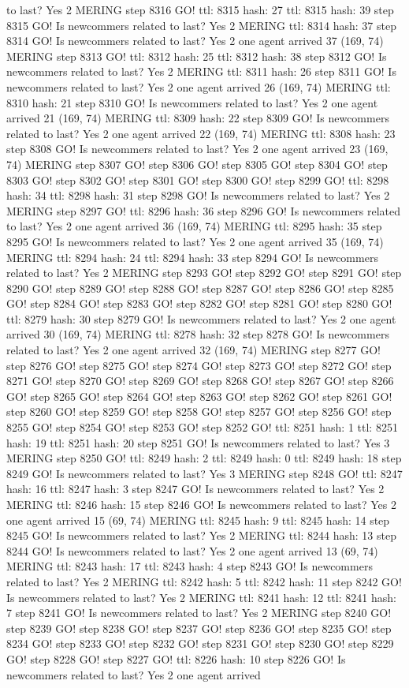 to last? Yes 2 MERING step 8316 GO! ttl: 8315 hash: 27 ttl: 8315 hash: 39 step 8315 GO! Is newcommers related to last? Yes 2 MERING ttl: 8314 hash: 37 step 8314 GO! Is newcommers related to last? Yes 2 one agent arrived 37 (169, 74) MERING step 8313 GO! ttl: 8312 hash: 25 ttl: 8312 hash: 38 step 8312 GO! Is newcommers related to last? Yes 2 MERING ttl: 8311 hash: 26 step 8311 GO! Is newcommers related to last? Yes 2 one agent arrived 26 (169, 74) MERING ttl: 8310 hash: 21 step 8310 GO! Is newcommers related to last? Yes 2 one agent arrived 21 (169, 74) MERING ttl: 8309 hash: 22 step 8309 GO! Is newcommers related to last? Yes 2 one agent arrived 22 (169, 74) MERING ttl: 8308 hash: 23 step 8308 GO! Is newcommers related to last? Yes 2 one agent arrived 23 (169, 74) MERING step 8307 GO! step 8306 GO! step 8305 GO! step 8304 GO! step 8303 GO! step 8302 GO! step 8301 GO! step 8300 GO! step 8299 GO! ttl: 8298 hash: 34 ttl: 8298 hash: 31 step 8298 GO! Is newcommers related to last? Yes 2 MERING step 8297 GO! ttl: 8296 hash: 36 step 8296 GO! Is newcommers related to last? Yes 2 one agent arrived 36 (169, 74) MERING ttl: 8295 hash: 35 step 8295 GO! Is newcommers related to last? Yes 2 one agent arrived 35 (169, 74) MERING ttl: 8294 hash: 24 ttl: 8294 hash: 33 step 8294 GO! Is newcommers related to last? Yes 2 MERING step 8293 GO! step 8292 GO! step 8291 GO! step 8290 GO! step 8289 GO! step 8288 GO! step 8287 GO! step 8286 GO! step 8285 GO! step 8284 GO! step 8283 GO! step 8282 GO! step 8281 GO! step 8280 GO! ttl: 8279 hash: 30 step 8279 GO! Is newcommers related to last? Yes 2 one agent arrived 30 (169, 74) MERING ttl: 8278 hash: 32 step 8278 GO! Is newcommers related to last? Yes 2 one agent arrived 32 (169, 74) MERING step 8277 GO! step 8276 GO! step 8275 GO! step 8274 GO! step 8273 GO! step 8272 GO! step 8271 GO! step 8270 GO! step 8269 GO! step 8268 GO! step 8267 GO! step 8266 GO! step 8265 GO! step 8264 GO! step 8263 GO! step 8262 GO! step 8261 GO! step 8260 GO! step 8259 GO! step 8258 GO! step 8257 GO! step 8256 GO! step 8255 GO! step 8254 GO! step 8253 GO! step 8252 GO! ttl: 8251 hash: 1 ttl: 8251 hash: 19 ttl: 8251 hash: 20 step 8251 GO! Is newcommers related to last? Yes 3 MERING step 8250 GO! ttl: 8249 hash: 2 ttl: 8249 hash: 0 ttl: 8249 hash: 18 step 8249 GO! Is newcommers related to last? Yes 3 MERING step 8248 GO! ttl: 8247 hash: 16 ttl: 8247 hash: 3 step 8247 GO! Is newcommers related to last? Yes 2 MERING ttl: 8246 hash: 15 step 8246 GO! Is newcommers related to last? Yes 2 one agent arrived 15 (69, 74) MERING ttl: 8245 hash: 9 ttl: 8245 hash: 14 step 8245 GO! Is newcommers related to last? Yes 2 MERING ttl: 8244 hash: 13 step 8244 GO! Is newcommers related to last? Yes 2 one agent arrived 13 (69, 74) MERING ttl: 8243 hash: 17 ttl: 8243 hash: 4 step 8243 GO! Is newcommers related to last? Yes 2 MERING ttl: 8242 hash: 5 ttl: 8242 hash: 11 step 8242 GO! Is newcommers related to last? Yes 2 MERING ttl: 8241 hash: 12 ttl: 8241 hash: 7 step 8241 GO! Is newcommers related to last? Yes 2 MERING step 8240 GO! step 8239 GO! step 8238 GO! step 8237 GO! step 8236 GO! step 8235 GO! step 8234 GO! step 8233 GO! step 8232 GO! step 8231 GO! step 8230 GO! step 8229 GO! step 8228 GO! step 8227 GO! ttl: 8226 hash: 10 step 8226 GO! Is newcommers related to last? Yes 2 one agent arrived 